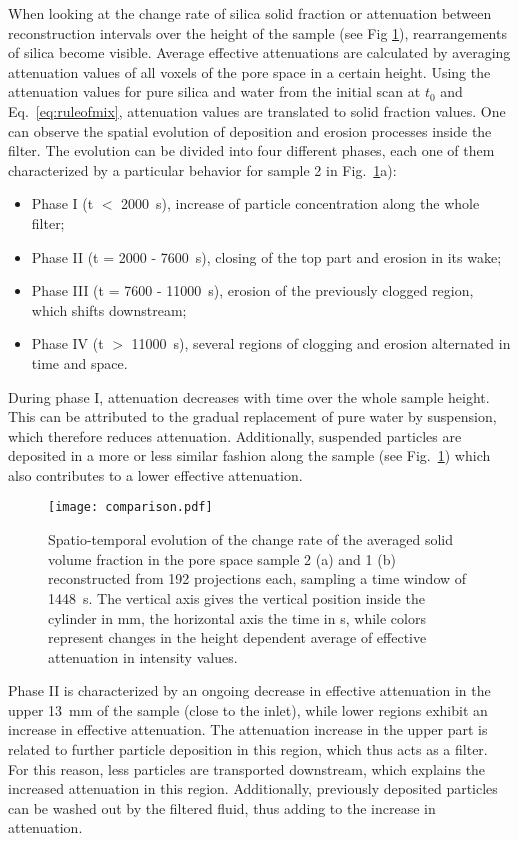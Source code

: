 \documentclass[smallextended]{svjour3}       %
\begin{document}
When looking at the change rate of silica solid fraction or attenuation between reconstruction intervals over the height of the sample (see Fig \ref{fig:attenuation_rates}), rearrangements of silica become visible. Average effective attenuations are calculated by averaging attenuation values of all voxels of the pore space in a certain height. Using the attenuation values for pure silica and water from the initial scan at $t_0$ and Eq.~\ref{eq:ruleofmix}, attenuation values are translated to solid fraction values. One can observe the spatial evolution of deposition and erosion processes inside the filter. The evolution can be divided into four different phases, each one of them characterized by a particular behavior for sample 2 in Fig.~\ref{fig:attenuation_rates}a):
\begin{itemize}
\item Phase I (t $<$ 2000~s), increase of particle concentration along the whole filter;
\item Phase II (t = 2000 - 7600~s), closing of the top part and erosion in its wake;
\item Phase III (t = 7600 - 11000~s), erosion of the previously clogged region, which shifts downstream;
\item Phase IV (t $>$ 11000~s), several regions of clogging and erosion alternated in time and space.
\end{itemize}

During phase I, attenuation decreases with time over the whole sample height. This can be attributed to the gradual replacement of pure water by suspension, which therefore reduces attenuation. Additionally, suspended particles are deposited in a more or less similar fashion along the sample (see Fig.~\ref{fig:attenuation_rates}) which also contributes to a lower effective attenuation.
\begin{figure}[hbtp]
\texttt{[image: comparison.pdf]}
\caption{\label{fig:attenuation_rates} Spatio-temporal evolution of the change rate of the averaged solid volume fraction in the pore space sample 2 (a) and 1 (b) reconstructed from 192 projections each, sampling a time window of 1448~s. The vertical axis gives the vertical position inside the cylinder in mm, the horizontal axis the time in s, while colors represent changes in the height dependent average of effective attenuation in intensity values.}
\end{figure}

Phase II is characterized by an ongoing decrease in effective attenuation in the upper 13~mm of the sample (close to the inlet), while lower regions exhibit an increase in effective attenuation. The attenuation increase in the upper part is related to further particle deposition in this region, which thus acts as a filter. For this reason, less particles are transported downstream, which explains the increased attenuation in this region. Additionally, previously deposited particles can be washed out by the filtered fluid, thus adding to the increase in attenuation.
\end{document}
